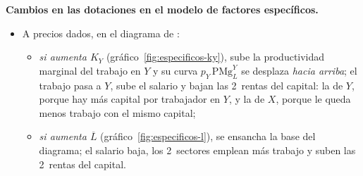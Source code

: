 \documentclass[11pt]{article}
\begin{document}
\begin{anotaciones}
\textbf{Cambios en las dotaciones en el modelo de factores específicos.}
\begin{itemize}
\item A precios dados, en el diagrama de :
  \begin{itemize}
  \item \emph{si aumenta $K_Y$} (gráfico~\ref{fig:especificos-ky}), sube la productividad marginal del trabajo en $Y$ y su curva $p_Y\,\mathrm{PMg}_L^Y$ se desplaza \emph{hacia arriba}; el trabajo pasa a $Y$, sube el salario y bajan las 2~rentas del capital: la de $Y$, porque hay más capital por trabajador en $Y$, y la de $X$, porque le queda menos trabajo con el mismo capital;
  \item \emph{si aumenta $\overline L$} (gráfico~\ref{fig:especificos-l}), se ensancha la base del diagrama; el salario baja, los 2~sectores emplean más trabajo y suben las 2~rentas del capital.
  \end{itemize}
\end{itemize}
\begin{figuracaja}
\caption{Factores específicos: aumenta el capital específico de $Y$}\label{fig:especificos-ky}
\end{figuracaja}
\begin{figuracaja}
\caption{Factores específicos: aumenta el factor móvil, el trabajo}\label{fig:especificos-l}
\end{figuracaja}
\end{anotaciones}
\end{document}
